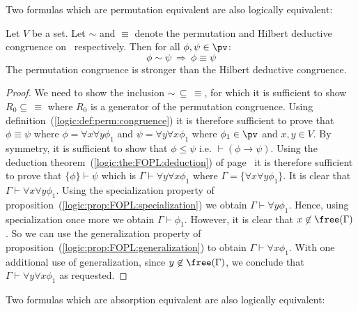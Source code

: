 Two formulas which are permutation equivalent are also logically
equivalent:

\begin{prop}\label{logic:prop:FOPL:HDC:permutation:v:HDC}
Let $V$ be a set. Let $\sim$ and $\equiv$ denote the permutation and
Hilbert deductive congruence on \pv\ respectively. Then for all
$\phi,\psi\in\pv$:
    \[
    \phi\sim\psi\ \Rightarrow\ \phi\equiv\psi
    \]
The permutation congruence is stronger than the Hilbert deductive
congruence.
\end{prop}
\begin{proof}
We need to show the inclusion $\sim\,\subseteq\,\equiv$, for which
it is sufficient to show $R_{0}\subseteq\,\equiv$ where $R_{0}$ is a
generator of the permutation congruence. Using
definition~(\ref{logic:def:perm:congruence}) it is therefore
sufficient to prove that $\phi\equiv\psi$ where $\phi=\forall
x\forall y\phi_{1}$ and $\psi=\forall y\forall x\phi_{1}$ where
$\phi_{1}\in\pv$ and $x,y\in V$. By symmetry, it is sufficient to
show that $\phi\leq\psi$ i.e. $\vdash(\phi\to\psi)$. Using the
deduction theorem~(\ref{logic:the:FOPL:deduction}) of
page~\pageref{logic:the:FOPL:deduction} it is therefore sufficient
to prove that $\{\phi\}\vdash\psi$ which is $\Gamma\vdash\forall
y\forall x\phi_{1}$ where $\Gamma=\{\forall x\forall y\phi_{1}\}$.
It is clear that $\Gamma\vdash\forall x\forall y\phi_{1}$. Using the
specialization property of
proposition~(\ref{logic:prop:FOPL:specialization}) we obtain
$\Gamma\vdash\forall y\phi_{1}$. Hence, using specialization once
more we obtain $\Gamma\vdash\phi_{1}$. However, it is clear that
$x\not\in\free(\Gamma)$. So we can use the generalization property
of proposition~(\ref{logic:prop:FOPL:generalization}) to obtain
$\Gamma\vdash\forall x\phi_{1}$. With one additional use of
generalization, since $y\not\in\free(\Gamma)$, we conclude that
$\Gamma\vdash\forall y\forall x\phi_{1}$ as requested.
\end{proof}

Two formulas which are absorption equivalent are also logically
equivalent:

